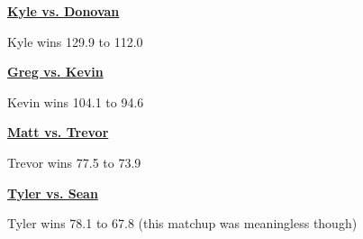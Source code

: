 \documentclass[11pt,letterpaper]{article}
\begin{document}
\noindent\textbf{\href{http://games.espn.com/ffl/boxscorefull?leagueId=1016777&teamId=1&scoringPeriodId=14&seasonId=2016&view=scoringperiod&version=full}
{Kyle vs. Donovan}}
\par\noindent Kyle wins 129.9 to 112.0
\bigskip
\par\noindent




\textbf{\href{http://games.espn.com/ffl/boxscorefull?leagueId=1016777&teamId=3&scoringPeriodId=14&seasonId=2016&view=scoringperiod&version=full}
{Greg vs. Kevin}}
\par\noindent Kevin wins 104.1 to 94.6
\bigskip
\par\noindent




\noindent\textbf{\href{http://games.espn.com/ffl/boxscorefull?leagueId=1016777&teamId=2&scoringPeriodId=14&seasonId=2016&view=scoringperiod&version=full}
{Matt vs. Trevor}}
\par\noindent Trevor wins 77.5 to 73.9
\bigskip
\par\noindent



\noindent\textbf{\href{http://games.espn.com/ffl/boxscorefull?leagueId=1016777&teamId=12&scoringPeriodId=14&seasonId=2016&view=scoringperiod&version=full}
{Tyler vs. Sean}}
\par\noindent Tyler wins 78.1 to 67.8 (this matchup was meaningless though)
\bigskip
\par\noindent
\end{document}
